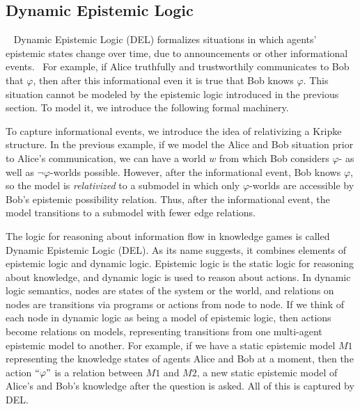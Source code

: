 \subsection{Dynamic Epistemic Logic}~\label{delsubsection}
Dynamic Epistemic Logic (DEL) formalizes situations in which agents' epistemic states change over time, due to announcements or other informational events.~\cite{DEL} For example, if Alice truthfully and trustworthily communicates to Bob that $\varphi$, then after this informational even it is true that Bob knows $\varphi$. This situation cannot be modeled by the epistemic logic introduced in the previous section. To model it, we introduce the following formal machinery.

To capture informational events, we introduce the idea of relativizing a Kripke structure. In the previous example, if we model the Alice and Bob situation prior to Alice's communication, we can have a world $w$ from which Bob considers $\varphi$- as well as $\neg\varphi$-worlds possible. However, after the informational event, Bob knows $\varphi$, so the model is \emph{relativized} to a submodel in which only $\varphi$-worlds are accessible by Bob's epistemic possibility relation. Thus, after the informational event, the model transitions to a submodel with fewer edge relations.

The logic for reasoning about information flow in knowledge games is called Dynamic Epistemic Logic (DEL). As its name suggests, it combines elements of epistemic logic and dynamic logic. Epistemic logic is the static logic for reasoning about knowledge, and dynamic logic is used to reason about actions. In dynamic logic semantics, nodes are states of the system or the world, and relations on nodes are transitions via programs or actions from node to node. If we think of each node in dynamic logic as being a model of epistemic logic, then actions become relations on models, representing transitions from one multi-agent epistemic model to another. For example, if we have a static epistemic model $M1$ representing the knowledge states of agents Alice and Bob at a moment, then the action $``\varphi"$ is a relation between $M1$ and $M2$, a new static epistemic model of Alice's and Bob's knowledge after the question is asked. All of this is captured by DEL.

